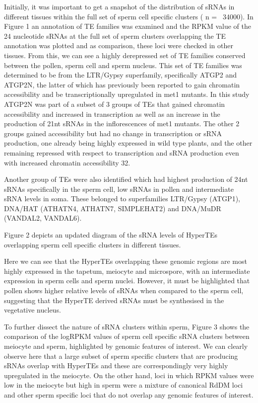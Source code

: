 Initially, it was important to get a snapshot of the distribution of sRNAs in different tissues within the full set of sperm cell specific clusters ( n = ~34000). In Figure 1 an annotation of TE families was examined and the RPKM value of the 24 nucleotide sRNAs at the full set of sperm clusters overlapping the TE annotation was plotted and as comparison, these loci were checked in other tissues. From this, we can see a highly derepressed set of TE families conserved between the pollen, sperm cell and sperm nucleus. This set of TE families was determined to be from the LTR/Gypsy superfamily, specifically ATGP2 and ATGP2N, the latter of which has previously been reported to gain chromatin accessibility and be transcriptionally upregulated in met1 mutants. In this study ATGP2N was part of a subset of 3 groups of TEs that gained chromatin accessibility and increased in transcription as well as an increase in the production of 21nt sRNAs in the inflorescences of met1 mutants. The other 2 groups gained accessibility but had no change in transcription or sRNA production, one already being highly expressed in wild type plants, and the other remaining repressed with respect to transcription and sRNA production even with increased chromatin accessibility 32.

Another group of TEs were also identified which had highest production of 24nt sRNAs specifically in the sperm cell, low sRNAs in pollen and intermediate sRNA levels in soma. These belonged to superfamilies LTR/Gypsy (ATGP1), DNA/HAT (ATHATN4, ATHATN7, SIMPLEHAT2) and DNA/MuDR (VANDAL2, VANDAL6).

Figure 2 depicts an updated diagram of the sRNA levels of HyperTEs overlapping sperm cell specific clusters in different tissues.

Here we can see that the HyperTEs overlapping these genomic regions are most highly expressed in the tapetum, meiocyte and microspore, with an intermediate expression in sperm cells and sperm nuclei. However, it must be highlighted that pollen shows higher relative levels of sRNAs when compared to the sperm cell, suggesting that the HyperTE derived sRNAs must be synthesised in the vegetative nucleus.

To further dissect the nature of sRNA clusters within sperm, Figure 3 shows the comparison of the logRPKM values of sperm cell specific sRNA clusters between meiocyte and sperm, highlighted by genomic features of interest. We can clearly observe here that a large subset of sperm specific clusters that are producing sRNAs overlap with HyperTEs and these are correspondingly very highly upregulated in the meiocyte.
On the other hand, loci in which RPKM values were low in the meiocyte but high in sperm were a mixture of canonical RdDM loci and other sperm specific loci that do not overlap any genomic features of interest.

